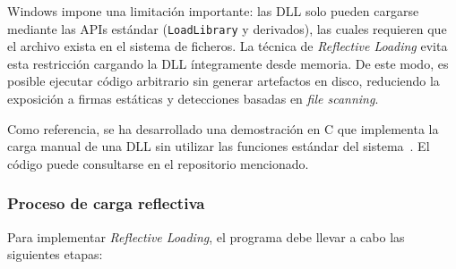 Windows impone una limitación importante: las DLL solo pueden cargarse mediante las APIs estándar (\texttt{LoadLibrary} y derivados), las cuales requieren que el archivo exista en el sistema de ficheros. La técnica de \textit{Reflective Loading} evita esta restricción cargando la DLL íntegramente desde memoria. De este modo, es posible ejecutar código arbitrario sin generar artefactos en disco, reduciendo la exposición a firmas estáticas y detecciones basadas en \textit{file scanning}.

Como referencia, se ha desarrollado una demostración en C que implementa la carga manual de una DLL sin utilizar las funciones estándar del sistema~\cite{walkingloader}. El código puede consultarse en el repositorio mencionado.

\subsubsection*{Proceso de carga reflectiva}
\label{sec:reflective}

Para implementar \textit{Reflective Loading}, el programa debe llevar a cabo las siguientes etapas:

